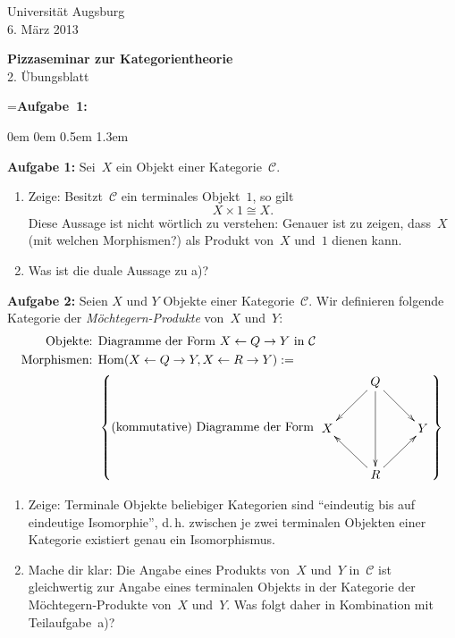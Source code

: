 \documentclass[a4paper,ngerman]{scrartcl}
\theoremstyle{definition}
\theoremstyle{plain}
\theoremstyle{remark}
\newcommand{\C}{\mathcal{C}}
\newcommand{\Hom}{\mathrm{Hom}}
\begin{document}
\vspace*{-4em}
\begin{flushright}Universität Augsburg \\ 6. März 2013\end{flushright}

\begin{center}\Large \textbf{Pizzaseminar zur Kategorientheorie} \\
2. Übungsblatt
\end{center}
\vspace{1.5em}

\newbox{\mybox}
\setbox\mybox=\hbox{\textbf{Aufgabe 1:}}

\begin{list}{}{0em \leftmargin0em \itemindent0.5em \itemsep 1.3em}
\item[\textbf{Aufgabe 1:}]
Sei~$X$ ein Objekt einer Kategorie~$\C$.
\begin{enumerate}
\item Zeige: Besitzt~$\C$ ein terminales Objekt~$1$, so gilt
\[ X \times 1 \cong X. \]
Diese Aussage ist nicht wörtlich zu verstehen: Genauer ist zu zeigen, dass~$X$
(mit welchen Morphismen?) als Produkt von~$X$ und~$1$ dienen kann.
\item Was ist die duale Aussage zu a)?
\end{enumerate}

\item[\textbf{Aufgabe 2:}]
Seien $X$ und $Y$ Objekte einer Kategorie~$\C$. Wir definieren folgende
Kategorie der \emph{Möchtegern-Produkte} von~$X$ und~$Y$:
\begin{align*}
  \text{Objekte: } & \text{Diagramme der Form $X \leftarrow Q \to Y$ in~$\C$} \\
  \text{Morphismen: } &
    \Hom(X \leftarrow Q \to Y, X \leftarrow R \to Y) := \\ & \left\{
      \text{(kommutative) Diagramme der Form $\vcenter{\xymatrix{
        & Q \ar[ld] \ar[dd] \ar[rd] \\
      X & & Y \\
        & R \ar[lu] \ar[ru]
      }}$} \right\}
\end{align*}
\begin{enumerate}
\item Zeige: Terminale Objekte beliebiger Kategorien sind "`eindeutig bis auf
eindeutige Isomorphie"', d.\,h. zwischen je zwei terminalen Objekten einer
Kategorie existiert genau ein Isomorphismus.
\item Mache dir klar: Die Angabe eines Produkts von~$X$ und~$Y$ in~$\C$ ist
gleichwertig zur Angabe eines terminalen Objekts in der Kategorie der
Möchtegern-Produkte von~$X$ und~$Y$. Was folgt daher in Kombination mit
Teilaufgabe~a)?
\end{enumerate}


\end{list}
\end{document}

